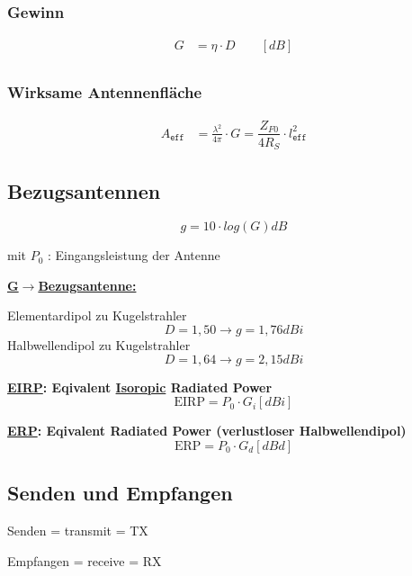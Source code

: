 \subsubsection{Gewinn}
\begin{align*}
    G & = \eta \cdot D \qquad [\si{dB}] \\
\end{align*}

\subsubsection{Wirksame Antennenfläche}
\begin{align*}
    A_\texttt{eff} & = \frac{\lambda^2}{4\pi}\cdot G = \dfrac{Z_{F0}}{4 R_S} \cdot l_\texttt{eff}^2
\end{align*}

\subsection{Bezugsantennen}
\[
    \boxed{g = 10 \cdot log(G) \si{dB}}
\]

mit $P_0$ : Eingangsleistung der Antenne

\begin{description}
    \item \textbf{\underline{G$\rightarrow$Bezugsantenne:}}

          Elementardipol  zu Kugelstrahler \[D = 1,50 \rightarrow g = 1,76\si{dBi}\]
          Halbwellendipol zu Kugelstrahler \[D = 1,64 \rightarrow g = 2,15\si{dBi}\]

    \item \textbf{\underline{EIRP}: Eqivalent \underline{Isoropic} Radiated Power}
          \[
              \text{EIRP} = P_0 \cdot G_i [\si{dBi}]
          \]

    \item \textbf{\underline{ERP}: Eqivalent Radiated Power (verlustloser Halbwellendipol)}
          \[
              \text{ERP} = P_0 \cdot G_d [\si{dBd}]
          \]
\end{description}

\subsection{Senden und Empfangen}


\begin{description}
    \item Senden = transmit = TX
    \item Empfangen = receive = RX
\end{description}

